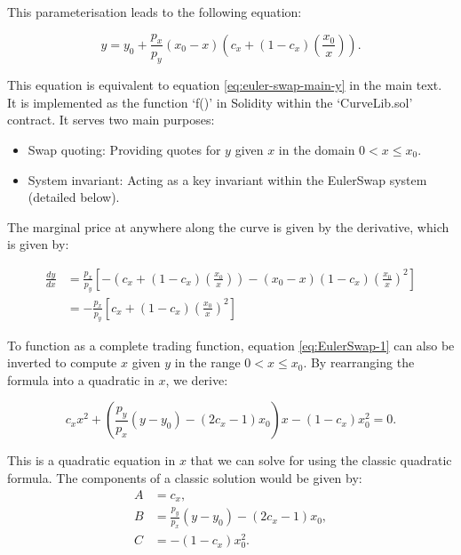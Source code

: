 \documentclass{article}
\begin{document}
This parameterisation leads to the following equation:

\begin{equation}
    \label{eq:EulerSwap-1}
    y = y_0 + \frac{p_x}{p_y} (x_0 - x) \left( c_x + (1 - c_x) \left(\frac{x_0}{x}\right) \right).
\end{equation}

This equation is equivalent to equation \eqref{eq:euler-swap-main-y} in the main text. It is implemented as the function `f()' in Solidity within the `CurveLib.sol' contract. It serves two main purposes:

\begin{itemize}
    \item Swap quoting: Providing quotes for \(y\) given \(x\) in the domain \(0 < x \leq x_0\).
    \item System invariant: Acting as a key invariant within the EulerSwap system (detailed below).
\end{itemize}

The marginal price at anywhere along the curve is given by the derivative, which is given by:

\begin{align}
    \frac{dy}{dx}
    &=
    \frac{p_x}{p_y} \left[ -\left( c_x + (1 - c_x) \left( \frac{x_0}{x} \right) \right) - (x_0 - x) (1 - c_x) \left( \frac{x_0}{x} \right)^2 \right] \\ \nonumber
    &=
    -\frac{p_x}{p_y} \left[ c_x + (1 - c_x) \left( \frac{x_0}{x} \right)^2 \right] 
\end{align}

To function as a complete trading function, equation \eqref{eq:EulerSwap-1} can also be inverted to compute \(x\) given \(y\) in the range \(0 < x \leq x_0\). By rearranging the formula into a quadratic in \(x\), we derive:

\begin{equation}
    \label{eq:EulerSwap-inverse-1}
    c_{x}x^{2} + \left( \frac{p_{y}}{p_{x}} \left( y - y_{0} \right) - \left( 2c_{x} - 1 \right) x_{0} \right) x - \left(1 - c_{x} \right) x_{0}^{2} = 0.
\end{equation}

This is a quadratic equation in $x$ that we can solve for using the classic quadratic formula. The components of a classic solution would be given by:
\begin{align}
    A 
    &= 
    c_x, \\ \nonumber
    B 
    &=
    \frac{p_{y}}{p_{x}} \left( y - y_{0} \right) - \left( 2c_{x} - 1 \right) x_{0}, \\ \nonumber
    C 
    &= - \left(1 - c_{x} \right) x_{0}^{2}. 
\end{align}
\end{document}
